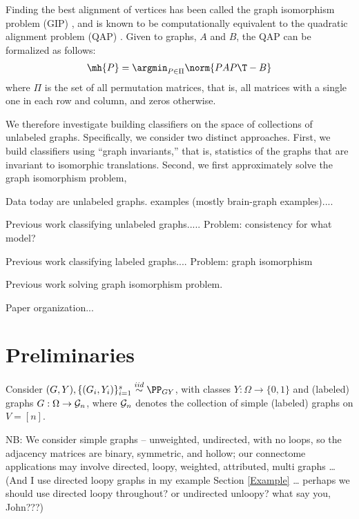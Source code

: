 



Finding the best alignment of vertices has been called the graph isomorphism problem (GIP) \cite{??}, and is known to be computationally equivalent to the quadratic alignment problem (QAP) \cite{??}.  Given to graphs, $A$ and $B$, the QAP can be formalized as follows:
\begin{align}
	\mh{P} = \argmin_{P \in \Pi} \norm{PAP\T - B}
\end{align}
where $\Pi$ is the set of all permutation matrices, that is, all matrices with a single one in each row and column, and zeros otherwise.  


We therefore investigate building classifiers on the space of collections of unlabeled graphs.  Specifically, we consider two distinct approaches. First, we build classifiers using ``graph invariants,'' that is, statistics of the graphs that are invariant to isomorphic translations.  Second, we first approximately solve the graph isomorphism problem,  





Data today are unlabeled graphs.  examples (mostly brain-graph examples)....

Previous work classifying unlabeled graphs..... Problem: consistency for what model?

Previous work classifying labeled graphs.... Problem: graph isomorphism

Previous work solving graph isomorphism problem.

Paper organization...

\section{Preliminaries} %
\label{sec:preliminaries}



Consider $(G,Y),\{(G_i,Y_i)\}_{i=1}^s \overset{iid}{\sim} \PP_{GY}$,
with classes $Y:\Omega \rightarrow \{0,1\}$ and
(labeled) graphs $G:\Omega \rightarrow \mathcal{G}_n$,
where $\mathcal{G}_n$ denotes the collection of simple (labeled) graphs on $V=[n]$.

NB:
We consider simple graphs -- unweighted, undirected, with no loops,
so the adjacency matrices are binary, symmetric, and hollow;
our connectome applications
may involve {directed, loopy, weighted, attributed, multi} graphs \ldots
(And I use directed loopy graphs in my example Section \ref{Example} \dots
perhaps we should use directed loopy throughout? or undirected unloopy? what say you, John???)

